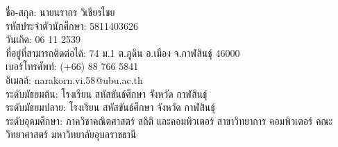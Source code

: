 {\begin{biography}
\justify
ชื่อ-สกุล: นายนรากร วิเชียรไชย \\
รหัสประจำตัวนักศึกษา: 5811403626\\
วันเกิด: 06 11 2539\\
ที่อยู่ที่สามารถติดต่อได้: 74 ม.1 ต.ภูดิน อ.เมือง จ.กาฬสินธุ์ 46000\\
เบอร์โทรศัพท์: (+66) 88 766 5841\\
อิเมลล์: narakorn.vi.58@ubu.ac.th\\
ระดับมัธยมต้น: โรงเรียน สหัสขันธ์ศึกษา จังหวัด กาฬสินธุ์\\
ระดับมัธยมปลาย: โรงเรียน สหัสขันธ์ศึกษา จังหวัด กาฬสินธุ์\\
ระดับอุดมศึกษา: ภาควิชาคณิตศาสตร์ สถิติ และคอมพิวเตอร์ สาขาวิทยาการ คอมพิวเตอร์ คณะวิทยาศาสตร์ มหาวิทยาลัยอุบลราชธานี
\end{biography}}

